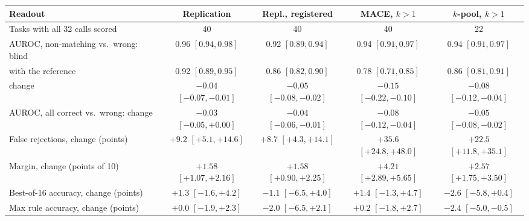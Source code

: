 \begin{tabular}{lcccc}
\toprule
Readout & Replication & Repl., registered & \textsc{MACE}, $k{>}1$ & $k$-pool, $k{>}1$ \\
\midrule
Tasks with all 32 calls scored & 40 & 40 & 40 & 22 \\
AUROC, non-matching vs.\ wrong: blind & 0.96 {\scriptsize$[0.94,0.98]$} & 0.92 {\scriptsize$[0.89,0.94]$} & 0.94 {\scriptsize$[0.91,0.97]$} & 0.94 {\scriptsize$[0.91,0.97]$} \\
\quad with the reference & 0.92 {\scriptsize$[0.89,0.95]$} & 0.86 {\scriptsize$[0.82,0.90]$} & 0.78 {\scriptsize$[0.71,0.85]$} & 0.86 {\scriptsize$[0.81,0.91]$} \\
\quad change & $-0.04$ {\scriptsize$[-0.07,-0.01]$} & $-0.05$ {\scriptsize$[-0.08,-0.02]$} & $-0.15$ {\scriptsize$[-0.22,-0.10]$} & $-0.08$ {\scriptsize$[-0.12,-0.04]$} \\
AUROC, all correct vs.\ wrong: change & $-0.03$ {\scriptsize$[-0.05,+0.00]$} & $-0.04$ {\scriptsize$[-0.06,-0.01]$} & $-0.08$ {\scriptsize$[-0.12,-0.04]$} & $-0.05$ {\scriptsize$[-0.08,-0.02]$} \\
False rejections, change (points) & $+9.2$ {\scriptsize$[+5.1,+14.6]$} & $+8.7$ {\scriptsize$[+4.3,+14.1]$} & $+35.6$ {\scriptsize$[+24.8,+48.0]$} & $+22.5$ {\scriptsize$[+11.8,+35.1]$} \\
Margin, change (points of 10) & $+1.58$ {\scriptsize$[+1.07,+2.16]$} & $+1.58$ {\scriptsize$[+0.90,+2.25]$} & $+4.21$ {\scriptsize$[+2.89,+5.65]$} & $+2.57$ {\scriptsize$[+1.75,+3.50]$} \\
Best-of-16 accuracy, change (points) & $+1.3$ {\scriptsize$[-1.6,+4.2]$} & $-1.1$ {\scriptsize$[-6.5,+4.0]$} & $+1.4$ {\scriptsize$[-1.3,+4.7]$} & $-2.6$ {\scriptsize$[-5.8,+0.4]$} \\
Max rule accuracy, change (points) & $+0.0$ {\scriptsize$[-1.9,+2.3]$} & $-2.0$ {\scriptsize$[-6.5,+2.1]$} & $+0.2$ {\scriptsize$[-1.8,+2.7]$} & $-2.4$ {\scriptsize$[-5.0,-0.5]$} \\
\bottomrule
\end{tabular}
